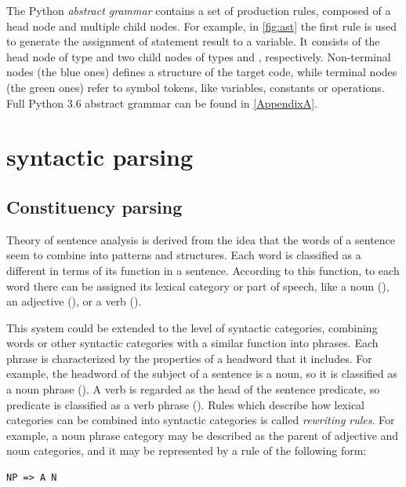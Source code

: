 The Python \emph{abstract grammar} contains a set of production rules, composed of a head node and multiple child nodes. For example, in \cref{fig:ast} the first rule is used to generate the assignment of statement result to a variable. It consists of the head node of type  and two child nodes of types  and , respectively. Non-terminal nodes (the blue ones) defines a  structure of the target code, while terminal nodes (the green ones) refer to symbol tokens, like variables, constants or operations. Full Python 3.6 abstract grammar can be found in  \cref{AppendixA}. 

\section{syntactic parsing}
\subsection{Constituency parsing}
Theory of sentence analysis is derived from the idea that the words of a sentence seem to combine into patterns and structures. Each word is classified as a different in terms of its function in a sentence. According to this function, to each word there can be assigned its lexical category or part of speech, like a noun (), an adjective (), or a verb (). 

This system could be extended to the level of syntactic categories, combining words or other syntactic categories with a similar function into phrases. Each phrase is characterized by the properties of a headword that it includes. For example, the headword of the subject of a sentence is a noun, so it is classified as a noun phrase (). A verb is regarded as the head of the sentence predicate, so predicate is classified as a verb phrase (). Rules which describe how lexical categories can be combined into syntactic categories is called \emph{rewriting rules}. For example, a noun phrase category may be described as the parent of adjective and noun categories, and it may be represented by a rule of the following form:

\begin{verbatim}
NP => A N
\end{verbatim}

